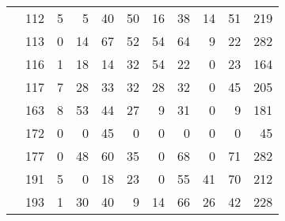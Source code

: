 \documentclass[
]{article}
\begin{document}
\begin{table}[!h]
\begin{tabular}[t]{l>{}l|rrrrrrr>{}r|r}
\hspace{1em} & 112 & 5 & 5 & 40 & 50 & 16 & 38 & 14 & 51 & 219\\

\hspace{1em} & 113 & 0 & 14 & 67 & 52 & 54 & 64 & 9 & 22 & 282\\

\hspace{1em} & 116 & 1 & 18 & 14 & 32 & 54 & 22 & 0 & 23 & 164\\

\hspace{1em} & 117 & 7 & 28 & 33 & 32 & 28 & 32 & 0 & 45 & 205\\

\hspace{1em} & 163 & 8 & 53 & 44 & 27 & 9 & 31 & 0 & 9 & 181\\

\hspace{1em} & 172 & 0 & 0 & 45 & 0 & 0 & 0 & 0 & 0 & 45\\

\hspace{1em} & 177 & 0 & 48 & 60 & 35 & 0 & 68 & 0 & 71 & 282\\

\hspace{1em} & 191 & 5 & 0 & 18 & 23 & 0 & 55 & 41 & 70 & 212\\

\hspace{1em} & 193 & 1 & 30 & 40 & 9 & 14 & 66 & 26 & 42 & 228\\
\bottomrule
\end{tabular}
\end{table}
\end{document}
